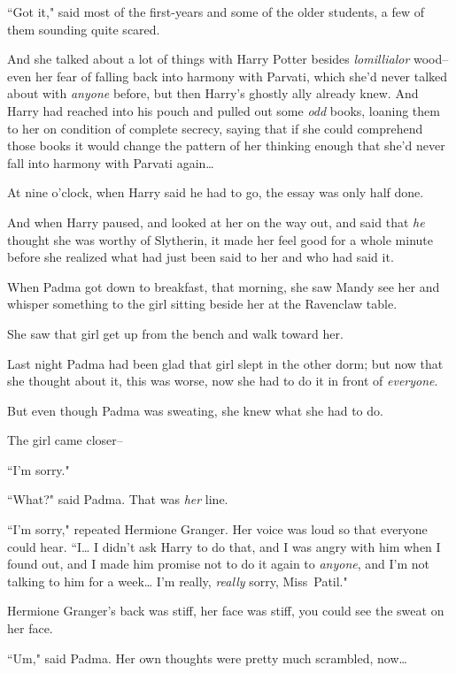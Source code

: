 ``Got it," said most of the first-years and some of the older students, a few of them sounding quite scared.

\later

And she talked about a lot of things with Harry Potter besides \emph{lomillialor} wood\---even her fear of falling back into harmony with Parvati, which she'd never talked about with \emph{anyone} before, but then Harry's ghostly ally already knew. And Harry had reached into his pouch and pulled out some \emph{odd} books, loaning them to her on condition of complete secrecy, saying that if she could comprehend those books it would change the pattern of her thinking enough that she'd never fall into harmony with Parvati again{\ldots}

At nine o'clock, when Harry said he had to go, the essay was only half done.

And when Harry paused, and looked at her on the way out, and said that \emph{he} thought she was worthy of Slytherin, it made her feel good for a whole minute before she realized what had just been said to her and who had said it.

\later

When Padma got down to breakfast, that morning, she saw Mandy see her and whisper something to the girl sitting beside her at the Ravenclaw table.

She saw that girl get up from the bench and walk toward her.

Last night Padma had been glad that girl slept in the other dorm; but now that she thought about it, this was worse, now she had to do it in front of \emph{everyone}.

But even though Padma was sweating, she knew what she had to do.

The girl came closer\---

``I'm sorry."

``What?" said Padma. That was \emph{her} line.

``I'm sorry," repeated Hermione Granger. Her voice was loud so that everyone could hear. ``I{\ldots} I didn't ask Harry to do that, and I was angry with him when I found out, and I made him promise not to do it again to \emph{anyone}, and I'm not talking to him for a week{\ldots} I'm really, \emph{really} sorry, Miss~Patil."

Hermione Granger's back was stiff, her face was stiff, you could see the sweat on her face.

``Um," said Padma. Her own thoughts were pretty much scrambled, now{\ldots}

